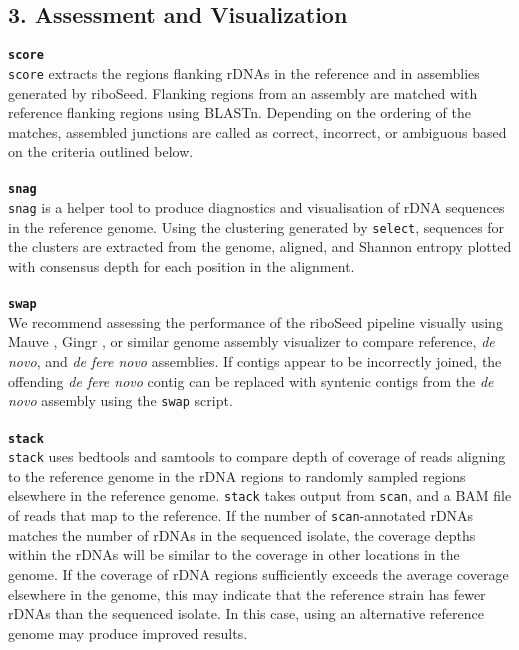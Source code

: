 \subsection*{3. Assessment and Visualization}

\textbf{\texttt{score}}\\
\texttt{score} extracts the regions flanking rDNAs in the reference and in assemblies generated by riboSeed. Flanking regions from an assembly are matched with reference flanking regions using BLASTn. Depending on the ordering of the matches, assembled junctions are called as correct, incorrect, or ambiguous based on the criteria outlined below.\\
\\
\textbf{\texttt{snag}}\\
\texttt{snag} is a helper tool to produce diagnostics and visualisation of rDNA sequences in the reference genome. Using the clustering generated by \texttt{select}, sequences for the clusters are extracted from the genome, aligned, and Shannon entropy \cite{Schmitt1997} plotted with consensus depth for each position in the alignment.\\
\\
\textbf{\texttt{swap}}\\
We recommend assessing the performance of the riboSeed pipeline visually using Mauve \cite{Darling2004,Darling2011}, Gingr \cite{Treangen2014}, or similar genome assembly visualizer to compare reference, \textit{de novo}, and \textit{de fere novo} assemblies. If contigs appear to be incorrectly joined, the offending \textit{de fere novo} contig can be replaced with syntenic contigs from the \textit{de novo} assembly using the \texttt{swap} script.\\
\\
\textbf{\texttt{stack}}\\
\texttt{stack} uses bedtools \cite{Quinlan2010} and samtools \cite{Li2009} to compare depth of coverage of reads aligning to the reference genome in the rDNA regions to randomly sampled regions elsewhere in the reference genome. \texttt{stack} takes output from \texttt{scan}, and a BAM file of reads that map to the reference. If the number of \texttt{scan}-annotated rDNAs matches the number of rDNAs in the sequenced isolate, the coverage depths within the rDNAs will be similar to the coverage in other locations in the genome. If the coverage of rDNA regions sufficiently exceeds the average coverage elsewhere in the genome, this may indicate that the reference strain has fewer rDNAs than the sequenced isolate. In this case, using an alternative reference genome may produce improved results.
